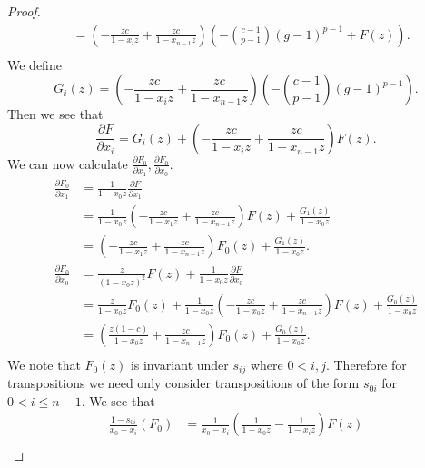 \documentclass{amsart}
\numberwithin{equation}{section}
\theoremstyle{definition}
\begin{document}
\begin{proof}
\begin{align*}
&=\left(-\frac{zc}{1-x_iz}+\frac{zc}{1-x_{n-1}z}\right)\left(-\binom{c-1}{p-1}(g-1)^{p-1}+F(z)\right).\\
\end{align*}
We define
\[
G_i(z)=\left(-\frac{zc}{1-x_iz}+\frac{zc}{1-x_{n-1}z}\right)\left(-\binom{c-1}{p-1}(g-1)^{p-1}\right).
\]
Then we see that 
\[
\frac{\partial F}{\partial x_i}=G_i(z)+\left(-\frac{zc}{1-x_iz}+\frac{zc}{1-x_{n-1}z}\right)F(z).
\]
We can now calculate $\frac{\partial F_0}{\partial x_1},\frac{\partial F_0}{\partial x_0}$. 
\begin{align*}
\frac{\partial F_0}{\partial x_1}%
&=\frac{1}{1-x_0z}\frac{\partial F}{\partial x_1}\\
&=\frac{1}{1-x_0z}\left(-\frac{zc}{1-x_1z}+\frac{zc}{1-x_{n-1}z}\right)F(z)+\frac{G_1(z)}{1-x_0z}\\
&=\left(-\frac{zc}{1-x_1z}+\frac{zc}{1-x_{n-1}z}\right)F_0(z)+\frac{G_1(z)}{1-x_0z}.\\
\frac{\partial F_0}{\partial x_0}%
&=\frac{z}{(1-x_0z)^2}F(z)+\frac{1}{1-x_0z}\frac{\partial F}{\partial x_0}\\
&=\frac{z}{1-x_0z}F_0(z)+\frac{1}{1-x_0z}\left(-\frac{zc}{1-x_0z}+\frac{zc}{1-x_{n-1}z}\right)F(z)+\frac{G_0(z)}{1-x_0z}\\
&=\left(\frac{z(1-c)}{1-x_0z}+\frac{zc}{1-x_{n-1}z}\right)F_0(z)+\frac{G_0(z)}{1-x_0z}.\\
\end{align*}
We note that $F_0(z)$ is invariant under $s_{ij}$ where $0 < i,j$. Therefore for transpositions we need only consider transpositions of the form $s_{0i}$ for $0 < i \le n-1$. We see that 
\begin{align*}
\frac{1-s_{0i}}{x_0-x_i}(F_0)%
&=\frac{1}{x_0-x_i}\left(\frac{1}{1-x_0z}-\frac{1}{1-x_iz}\right)F(z)\\

\end{align*}
\end{proof}
\end{document}
